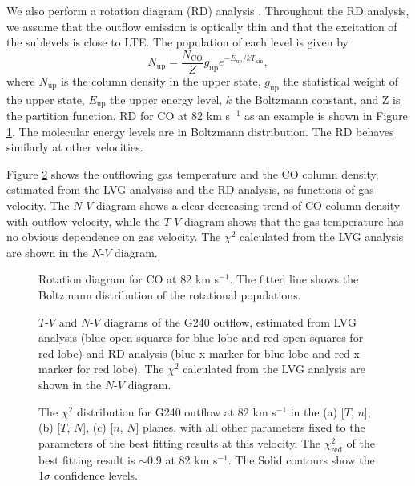 We also perform a rotation diagram (RD) analysis \citep{1999ApJ...517..209G}. Throughout the RD analysis, we assume that the outflow emission is optically thin and that the excitation of the sublevels is close to  LTE. The population of each level is given by 
\begin{equation}
N_{\mathrm{up}} = \frac{N_\mathrm{CO}}{Z} g_\mathrm{up} e^{-E_\mathrm{up}/kT_\mathrm{kin}},
\end{equation}
where $N_\mathrm{up}$ is the column density in the upper state, $g_\mathrm{up}$ the statistical weight of the upper state, $E_\mathrm{up}$ the upper energy level, $k$ the Boltzmann constant, and Z is the partition function.
RD for CO at 82 km s$^{-1}$ as an example is shown in Figure \ref{fig3}. The molecular energy levels are in Boltzmann distribution. The RD behaves similarly at other velocities. 

Figure \ref{fig:fig4} shows the outflowing gas temperature and the CO column density, estimated from the LVG analysiss and the RD analysis, as functions of gas velocity. The $N$-$V$ diagram shows a clear decreasing trend of CO column density with outflow velocity, while the $T$-$V$ diagram shows that the gas temperature has no obvious dependence on gas velocity. The $\chi^2$ calculated from the LVG analysis are shown in the $N$-$V$ diagram.

\begin{figure}[tbp]
\caption{Rotation diagram for CO at 82 km s$^{-1}$.  The fitted line shows the Boltzmann distribution of the rotational populations. \label{fig3}}
\end{figure}

\begin{figure}
\caption{$T$-$V$ and $N$-$V$ diagrams of the G240 outflow, estimated from LVG analysis (blue open squares for blue lobe and red open squares for red lobe) and RD analysis (blue x marker for blue lobe and red x marker for red lobe). The $\chi^2$ calculated from the LVG analysis are shown in the $N$-$V$ diagram. \label{fig:fig4}}
\end{figure}

\begin{figure}
\caption{The $\chi^2$ distribution for G240 outflow at 82 km s$^{-1}$ in the (a) [$T$, $n$], (b) [$T$, $N$], (c) [$n$, $N$] planes, with all other parameters fixed to the parameters of the best fitting results at this velocity. The $\chi^2_{\mathrm{red}}$ of the best fitting result is $\sim$0.9 at 82 km s$^{-1}$. The Solid contours show the 1$\sigma$ confidence levels. \label{fig:fig5}}
\end{figure}

